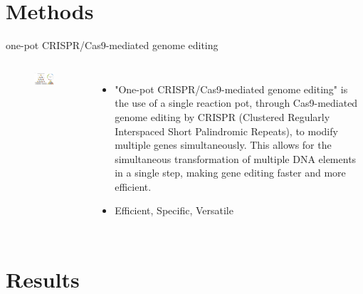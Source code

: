 \documentclass{beamer}
\begin{document}
\section{Methods}

\begin{frame}{one-pot CRISPR/Cas9-mediated genome editing}
		\begin{columns}
	    \begin{figure}
		\flushleft
		\includegraphics[width=5cm]{pic/onepot.pdf} 
 	    \end{figure}

    \begin{itemize} [<+-| alert@+>] %
        \item  "One-pot CRISPR/Cas9-mediated genome editing" is the use of a single reaction pot, through Cas9-mediated genome editing by CRISPR (Clustered Regularly Interspaced Short Palindromic Repeats), to modify multiple genes simultaneously. This allows for the simultaneous transformation of multiple DNA elements in a single step, making gene editing faster and more efficient.
        \item Efficient, Specific, Versatile

    \end{itemize}    
        \end{columns}


 
\end{frame}



\section{Results}
\end{document}
